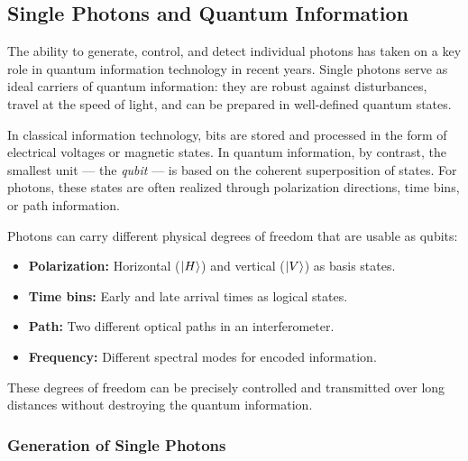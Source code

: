 \subsection{Single Photons and Quantum Information}

The ability to generate, control, and detect individual photons has taken on a key role in quantum information technology in recent years. Single photons serve as ideal carriers of quantum information: they are robust against disturbances, travel at the speed of light, and can be prepared in well-defined quantum states.

In classical information technology, bits are stored and processed in the form of electrical voltages or magnetic states. In quantum information, by contrast, the smallest unit — the \emph{qubit} — is based on the coherent superposition of states. For photons, these states are often realized through polarization directions, time bins, or path information.
\vspace{1em}
\begin{tcolorbox}[physikbox, title=What Makes a Photon an Information Carrier? \label{box:photon_information}]
	\small
	Photons can carry different physical degrees of freedom that are usable as qubits:
	\begin{itemize}
		\item \textbf{Polarization:} Horizontal ($\ket{H}$) and vertical ($\ket{V}$) as basis states.
		\item \textbf{Time bins:} Early and late arrival times as logical states.
		\item \textbf{Path:} Two different optical paths in an interferometer.
		\item \textbf{Frequency:} Different spectral modes for encoded information.
	\end{itemize}
	These degrees of freedom can be precisely controlled and transmitted over long distances without destroying the quantum information.
\end{tcolorbox}

\subsubsection{Generation of Single Photons}

